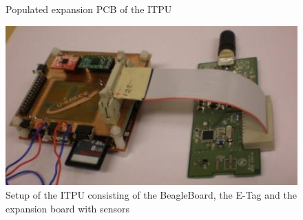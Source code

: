 \begin{figure}
\begin{centering}
{}
\par\end{centering}
\caption{Populated expansion PCB of the ITPU}
\end{figure}

\begin{figure}
\label{fig:itpu_setup}
\begin{centering}
\includegraphics[height=0.25\textheight]{figures/itpu-setup.jpg}
\par\end{centering}
\caption{Setup of the ITPU consisting of the BeagleBoard, the E-Tag and the expansion board with sensors}
\end{figure}



